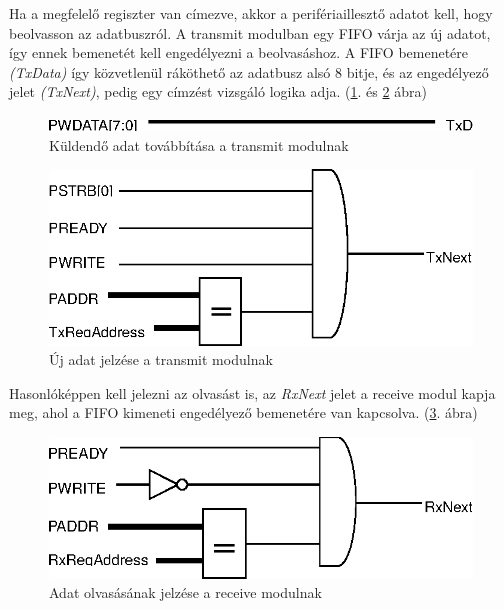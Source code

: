 Ha a megfelelő regiszter van címezve, akkor a perifériaillesztő adatot kell, hogy beolvasson az adatbuszról. A transmit modulban egy FIFO várja az új adatot, így ennek bemenetét kell engedélyezni a beolvasáshoz. A FIFO bemenetére \textit{(TxData)} így közvetlenül ráköthető az adatbusz alsó 8 bitje, és az engedélyező jelet \textit{(TxNext)}, pedig egy címzést vizsgáló logika adja. (\ref{fig:bloc_txdata}. és \ref{fig:bloc_txnext} ábra)

\begin{figure}[h]
\vspace{0.5cm}
\begin{center}
\includegraphics{figures/bloc_txdata.eps}
\caption{Küldendő adat továbbítása a transmit modulnak}
\label{fig:bloc_txdata}
\end{center}
\vspace{0.5cm}
\end{figure}
\begin{figure}[h]
\vspace{0.5cm}
\begin{center}
\includegraphics{figures/bloc_txnext.eps}
\caption{Új adat jelzése a transmit modulnak}
\label{fig:bloc_txnext}
\end{center}
\vspace{0.5cm}
\end{figure}

Hasonlóképpen kell jelezni az olvasást is, az \textit{RxNext} jelet a receive modul kapja meg, ahol a FIFO kimeneti engedélyező bemenetére van kapcsolva. (\ref{fig:bloc_rxnext}. ábra)

\begin{figure}[h]
\vspace{0.5cm}
\begin{center}
\includegraphics{figures/bloc_rxnext.eps}
\caption{Adat olvasásának jelzése a receive modulnak}
\label{fig:bloc_rxnext}
\end{center}
\vspace{0.5cm}
\end{figure}

